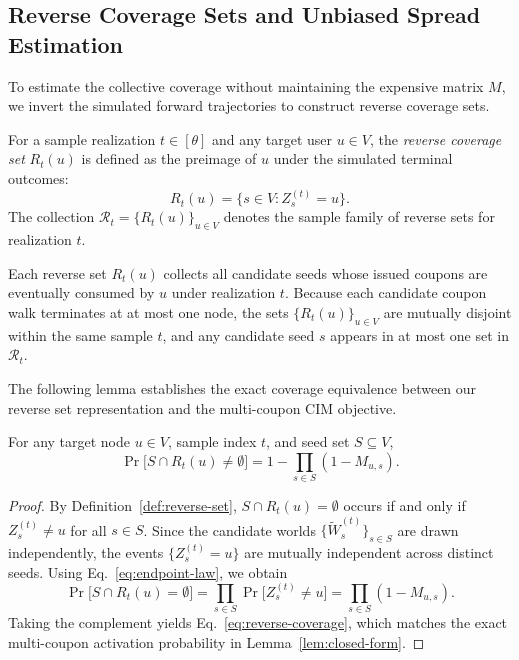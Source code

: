 \documentclass[sigconf]{acmart}
\begin{document}
\subsection{Reverse Coverage Sets and Unbiased Spread Estimation}
\label{sec:reverse-coverage}

To estimate the collective coverage without maintaining the expensive matrix
$M$, we invert the simulated forward trajectories to construct reverse coverage
sets.

\begin{definition}
\label{def:reverse-set}
For a sample realization $t\in[\theta]$ and any target user $u\in V$, the
\emph{reverse coverage set} $R_t(u)$ is defined as the preimage of $u$ under the
simulated terminal outcomes:
\begin{equation}
\label{eq:reverse-set-def}
  R_t(u) = \bigl\{s \in V : Z_s^{(t)} = u\bigr\}.
\end{equation}
The collection $\mathcal{R}_t = \{R_t(u)\}_{u\in V}$ denotes the sample family of
reverse sets for realization $t$.
\end{definition}

Each reverse set $R_t(u)$ collects all candidate seeds whose issued coupons
are eventually consumed by $u$ under realization $t$.
Because each candidate coupon walk terminates at at most one node, the sets
$\{R_t(u)\}_{u\in V}$ are mutually disjoint within the same sample $t$, and
any candidate seed $s$ appears in at most one set in $\mathcal{R}_t$.

The following lemma establishes the exact coverage equivalence between our
reverse set representation and the multi-coupon CIM objective.

\begin{lemma}
\label{lem:coverage}
For any target node $u \in V$, sample index $t$, and seed set $S \subseteq V$,
\begin{equation}
\label{eq:reverse-coverage}
  \Pr\bigl[S \cap R_t(u) \ne \emptyset\bigr]
  =
  1 - \prod_{s\in S}(1 - M_{u,s}).
\end{equation}
\end{lemma}

\begin{proof}
By Definition~\ref{def:reverse-set}, $S \cap R_t(u) = \emptyset$ occurs if and
only if $Z_s^{(t)} \ne u$ for all $s \in S$.
Since the candidate worlds $\{\widetilde{W}_s^{(t)}\}_{s\in S}$ are drawn
independently, the events $\{Z_s^{(t)} = u\}$ are mutually independent across
distinct seeds.
Using Eq.~\eqref{eq:endpoint-law}, we obtain
\[
  \Pr\bigl[S \cap R_t(u) = \emptyset\bigr]
  =
  \prod_{s\in S} \Pr\bigl[Z_s^{(t)} \ne u\bigr]
  =
  \prod_{s\in S} (1 - M_{u,s}).
\]
Taking the complement yields Eq.~\eqref{eq:reverse-coverage}, which matches the
exact multi-coupon activation probability in Lemma~\ref{lem:closed-form}.
\end{proof}
\end{document}
